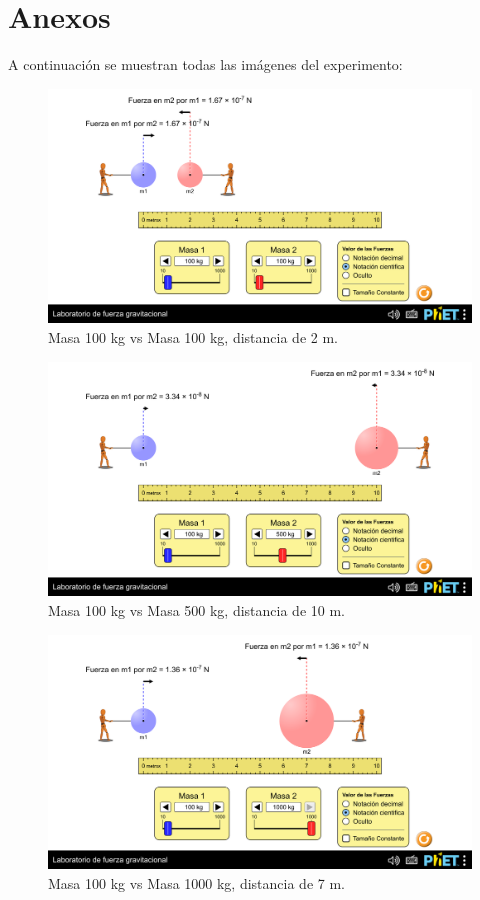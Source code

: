 \documentclass[a4paper,12pt]{article}
\begin{document}
\newpage
\section{Anexos}
A continuación se muestran todas las imágenes del experimento:

\begin{figure}[h]
    \centering
    \includegraphics[width=1\linewidth]{m1_100_m2_100_r_2.png}
    \caption{Masa 100 kg vs Masa 100 kg, distancia de 2 m.}
\end{figure}

\begin{figure}[h]
    \centering
    \includegraphics[width=1\linewidth]{m1_100_m2_500_r_10.png}
    \caption{Masa 100 kg vs Masa 500 kg, distancia de 10 m.}
\end{figure}

\begin{figure}[h]
    \centering
    \includegraphics[width=1\linewidth]{m1_100_m2_1000_r_7.png}
    \caption{Masa 100 kg vs Masa 1000 kg, distancia de 7 m.}
\end{figure}
\end{document}
